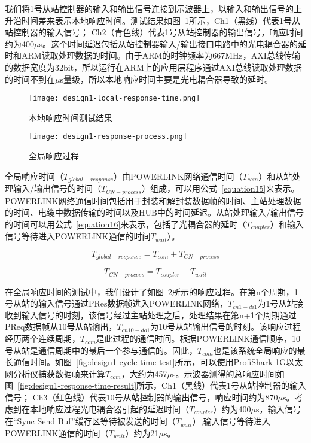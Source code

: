 我们将1号从站控制器的输入和输出信号连接到示波器上，以输入和输出信号的上升沿时间差来表示本地响应时间。测试结果如图~\ref{fig:design1-local-response-time}所示，Ch1（黑线）代表1号从站控制器的输入信号； Ch2（青色线）代表1号从站控制器的输出信号，响应时间约为400$\mu$s。这个时间延迟包括从站控制器输入/输出接口电路中的光电耦合器的延时和ARM读取处理数据的时间。由于ARM的时钟频率为667MHz，AXI总线传输的数据宽度为32bit，所以运行在ARM上的应用层程序通过AXI总线读取处理数据的时间不到在$\mu$s量级，所以本地响应时间主要是光电耦合器导致的延时。

\begin{figure}[!htb]
	\centering
	\texttt{[image: design1-local-response-time.png]}
	\caption{本地响应时间测试结果}
	\label{fig:design1-local-response-time}
\end{figure}

\begin{figure}[!htb]
  \centering
  \texttt{[image: design1-response-process.png]}
  \caption{全局响应过程}
  \label{fig:design1-response-process}
\end{figure}

全局响应时间（$T_{global-response}$）由POWERLINK网络通信时间（$T_{com}$）和从站处理输入/输出信号的时间（$T_{CN-process}$）组成，可以用公式~\ref{equation15}来表示。POWERLINK网络通信时间包括用于封装和解封装数据帧的时间、主站处理数据的时间、电缆中数据传输的时间以及HUB中的时间延迟。从站处理输入/输出信号的时间可以用公式~\ref{equation16}来表示，包括了光耦合器的延时（$T_{coupler}$）和输入信号等待进入POWERLINK通信的时间$T_{wait}$）。

\begin{equation}
\label{equation15}
T_{global-response}=T_{com}+T_{CN-process}
\end{equation}

\begin{equation}
\label{equation16}
T_{CN-process}=T_{coupler}+T_{wait}
\end{equation}

在全局响应时间的测试中，我们设计了如图~\ref{fig:design1-response-process}所示的响应过程。在第n个周期，1号从站的输入信号通过PRes数据帧进入POWERLINK网络，$T_{cn1-di1}$为1号从站接收到输入信号的时刻，该信号经过主站处理之后，处理结果在第n+1个周期通过PReq数据帧从10号从站输出，$T_{cn10-do1}$为10号从站输出信号的时刻。该响应过程经历两个连续周期，$T_{com}$是此过程的通信时间。根据POWERLINK通信顺序，10号从站是通信周期中的最后一个参与通信的。因此，$T_{com}$也是该系统全局响应的最长通信时间。如图~\ref{fig:design1-cycle-time-test}所示，可以使用ProfiShark 1G以太网分析仪捕获数据帧来计算$T_{com}$，大约为457$\mu$s。示波器测得的总响应时间如图~\ref{fig:design1-response-time-result}所示，Ch1（黑线）代表1号从站控制器的输入信号； Ch3（红色线）代表10号从站控制器的输出信号，响应时间约为870$\mu$s。考虑到在本地响应过程光电耦合器引起的延迟时间（$T_{coupler}$）约为400$\mu$s，输入信号在“Sync Send Buf”缓存区等待被发送的时间（$T_{wait}$）,输入信号等待进入POWERLINK通信的时间（$T_{wait}$）约为21$\mu$s。

